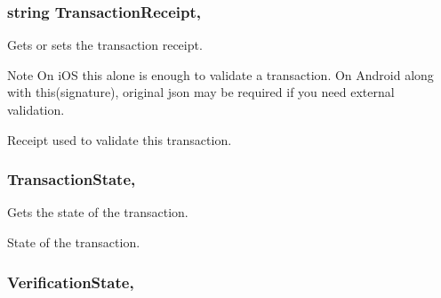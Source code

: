 \subsubsection[{Transaction\+Receipt}]{\setlength{\rightskip}{0pt plus 5cm}string Transaction\+Receipt\hspace{0.3cm}{\ttfamily [get]}, {}}\label{class_voxel_busters_1_1_native_plugins_1_1_billing_transaction_ad0f9bdbf147f11815849a829035b6378}


Gets or sets the transaction receipt. 

\begin{DoxyNote}{Note}
On i\+O\+S this alone is enough to validate a transaction. On Android along with this(signature), original json may be required if you need external validation. 
\end{DoxyNote}


Receipt used to validate this transaction.\hypertarget{class_voxel_busters_1_1_native_plugins_1_1_billing_transaction_a19bbd3b049d8d17a9ce4336540931e84}{}
\subsubsection[{Transaction\+State}]{ Transaction\+State\hspace{0.3cm}{\ttfamily [get]}, {}}\label{class_voxel_busters_1_1_native_plugins_1_1_billing_transaction_a19bbd3b049d8d17a9ce4336540931e84}


Gets the state of the transaction. 

State of the transaction.\hypertarget{class_voxel_busters_1_1_native_plugins_1_1_billing_transaction_ae25e822a1c56729c96fc4aa128af3364}{}
\subsubsection[{Verification\+State}]{ Verification\+State\hspace{0.3cm}{\ttfamily [get]}, {\ttfamily [set]}}\label{class_voxel_busters_1_1_native_plugins_1_1_billing_transaction_ae25e822a1c56729c96fc4aa128af3364}


